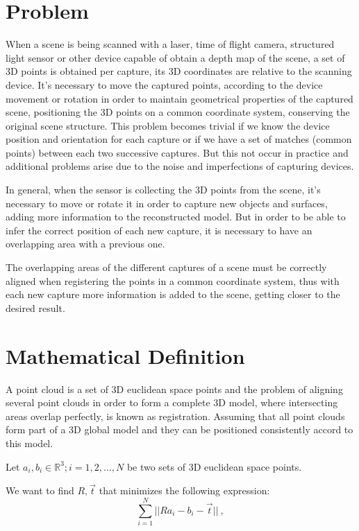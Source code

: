 \section{Problem}

When a scene is being scanned with a laser, time of flight camera, structured 
light sensor or other device capable of obtain a depth map of the scene,
 a set of 3D points is obtained per capture, its 3D coordinates 
are relative to the scanning device. It's necessary to move the captured points, 
according to the device movement or rotation in order to maintain geometrical properties of the captured scene,
 positioning the 3D points on a common coordinate system, conserving 
the original scene structure. This problem becomes trivial if we know the device position and orientation 
for each capture or if we have a set of matches (common points)  between each two successive 
captures. But this not occur in practice and additional problems arise due 
to the noise and imperfections of capturing devices.


In general, when the sensor is collecting the 3D points from the scene, 
 it's necessary to move or rotate it in order to capture new objects and surfaces,
 adding more information to the reconstructed model. But in order to be 
able to infer the correct position of each new capture, it is necessary to have an overlapping area with a previous one. 
 
The overlapping areas of the different captures of a scene must be correctly 
aligned when registering the points in a common coordinate system, 
thus with each new capture more information is added to the scene, 
getting closer to the desired result. 

\section{Mathematical Definition}

A point cloud is a set of 3D euclidean space points and the problem of aligning several point clouds 
in order to form a complete 3D model, where intersecting areas overlap perfectly, 
is known as registration. Assuming that all point clouds form part of a 3D global model and they can be 
 positioned  consistently accord to this model.

Let  ${a_i},{b_i} \in \mathbb{R}^3;i = 1,2,...,N$ be two sets of 3D euclidean space points.

We want to find $R,\vec{t}$ that minimizes the following expression:
$$
\sum\limits_{i=1}^N || Ra_i - b_i - \vec{t} || \ ,
$$

